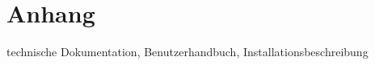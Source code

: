 \section{Anhang}

technische Dokumentation, Benutzerhandbuch, Installationsbeschreibung



\pagebreak